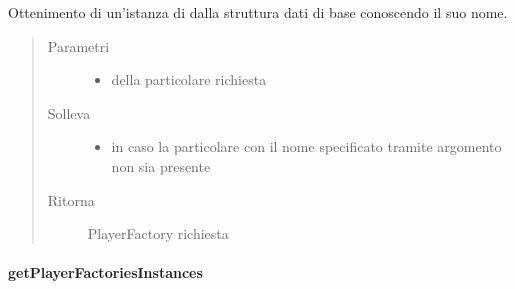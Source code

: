 \documentclass[letterpaper,10pt,italian,openany,oneside]{sphinxmanual}
\begin{document}
\begin{fulllineitems}
\label{\detokenize{test/it/unicam/cs/pa/mastermind/factories/PlayerFactoryRegistry:it.unicam.cs.pa.mastermind.factories.PlayerFactoryRegistry.getFactoryByName(String)}}
Ottenimento di un’istanza di  dalla struttura dati di base conoscendo il suo nome.
\begin{quote}\begin{description}
\item[{Parametri}] \leavevmode\begin{itemize}
\item {} 
 \textendash{} della particolare  richiesta

\end{itemize}

\item[{Solleva}] \leavevmode\begin{itemize}
\item {} 
 \textendash{} in caso la particolare  con il nome specificato tramite argomento non sia presente

\end{itemize}

\item[{Ritorna}] \leavevmode
PlayerFactory richiesta

\end{description}\end{quote}

\end{fulllineitems}



\paragraph{getPlayerFactoriesInstances}
\label{\detokenize{test/it/unicam/cs/pa/mastermind/factories/PlayerFactoryRegistry:getplayerfactoriesinstances}}
\end{document}
